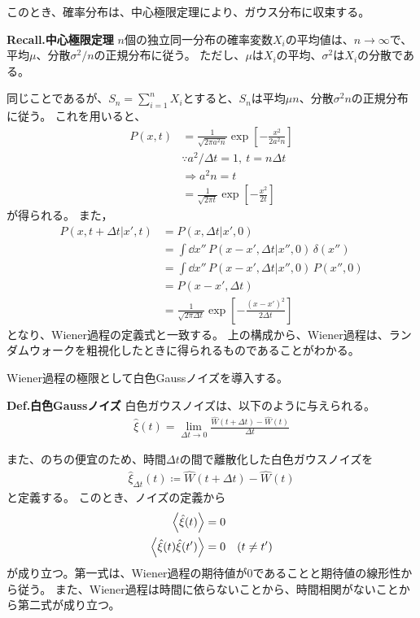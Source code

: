 \documentclass[a4paper,11pt]{jsarticle}
\numberwithin{equation}{section}
\begin{document}
このとき、確率分布は、中心極限定理により、ガウス分布に収束する。
\begin{itembox}[l]{\textbf{Recall.中心極限定理}}
  $n$個の独立同一分布の確率変数$X_i$の平均値は、$n \to \infty$で、平均$\mu$、分散$\sigma^2/n$の正規分布に従う。
  ただし、$\mu$は$X_i$の平均、$\sigma^2$は$X_i$の分散である。

\end{itembox}
同じことであるが、$S_n = \sum_{i=1}^n X_i$とすると、$S_n$は平均$\mu n$、分散$\sigma^2 n$の正規分布に従う。
これを用いると、
\begin{align}
  P(x, t) 
  &= \frac{1}{\sqrt{2\pi a^2 n}} \exp\left[ -\frac{x^2}{2 a^2 n} \right] \\
  &\because a^2 / \Delta t = 1,\ t = n \Delta t \\
  &\Rightarrow a^2 n = t \\
  &= \frac{1}{\sqrt{2\pi t}} \exp\left[ -\frac{x^2}{2t} \right]
\end{align}
が得られる。
また，
\begin{align}
  P(x, t + \Delta t | x', t)
  &= P(x, \Delta t | x', 0) \tag{4.1} \\
  &= \int \dd{x''}\, P(x - x', \Delta t | x'', 0)\, \delta(x'') \\
  &= \int \dd{x''}\, P(x - x', \Delta t | x'', 0)\, P(x'', 0) \\
  &= P(x - x', \Delta t) \\
  &= \frac{1}{\sqrt{2\pi \Delta t}} \exp\left[ -\frac{(x - x')^2}{2 \Delta t} \right]
\end{align}
となり、Wiener過程の定義式と一致する。
上の構成から、Wiener過程は、ランダムウォークを粗視化したときに得られるものであることがわかる。

Wiener過程の極限として白色Gaussノイズを導入する。
\begin{itembox}[l]{\textbf{Def.白色Gaussノイズ}}
    白色ガウスノイズは、以下のように与えられる。
    \begin{align}
        \hat{\xi}(t) = \lim_{\Delta t \to 0} \frac{\hat{W}(t+\Delta t) - \hat{W}(t)}{\Delta t}
    \end{align}
\end{itembox}
また、のちの便宜のため、時間$\Delta t$の間で離散化した白色ガウスノイズを
\begin{align}
    \hat{\xi}_{\Delta t}(t) \coloneq \hat{W}(t+\Delta t) - \hat{W}(t)
\end{align}
と定義する。
このとき、ノイズの定義から
\begin{align}
    \ev{\hat{\xi}(t)} &= 0 \label{eq:xi_mean} \\
    \ev{\hat{\xi}(t) \hat{\xi}(t')} &= 0 \quad (t \neq t') \label{eq:xi_correlation} \\
\end{align}
が成り立つ。第一式は、Wiener過程の期待値が0であることと期待値の線形性から従う。
また、Wiener過程は時間に依らないことから、時間相関がないことから第二式が成り立つ。
\end{document}
